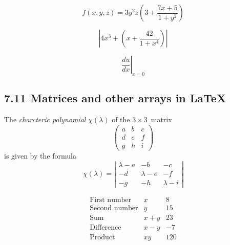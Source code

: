 \documentclass{article} %
\begin{document}


\[
f(x,y,z) = 3y^2 z \left( 3 + \frac{7x+5}{1+y^2} \right)
\]




\[
\left| 4 x^3 + \left( x + \frac{42}{1+x^4} \right) \right|
\]


\[
{\left. \frac{du}{dx} \right| }_{x=0}
\]

\subsection*{7.11 Matrices and other arrays in LaTeX}

The \emph{charcteric polynomial} $\chi(\lambda)$ of the
$3 \times 3$~matrix %
\[
\left( \begin{array}{ccc}
  a & b & c \\
  d & e & f \\
  g & h & i \end{array} \right)
\]
is given by the formula
\[
\chi(\lambda) = \left| \begin{array}{ccc}
  \lambda - a & -b & -c \\
  -d & \lambda - e & -f \\
  -g & -h & \lambda - i \end{array} \right|
\]


\[
\begin{array}{lcr}
    \mbox{First number} & x & 8 \\
    \mbox{Second number} & y & 15 \\
    \mbox{Sum} & x + y & 23 \\
    \mbox{Difference} & x - y & -7 \\
    \mbox{Product} & xy & 120 \end{array}
\]
\end{document}
